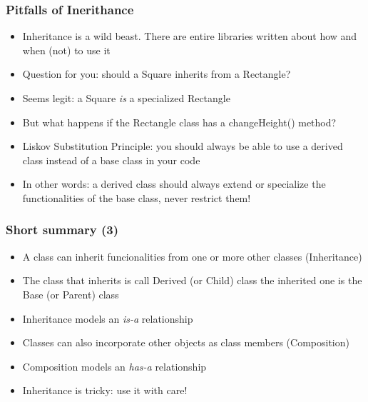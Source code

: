 \documentclass[9pt]{beamer}
\begin{document}
\begin{frame}
  \frametitle{Pitfalls of Inerithance}
    
  \begin{itemize}
    \item Inheritance is a wild beast. There are entire libraries written about how and when (not) to use it
    
    \bigskip
    
    \item Question for you: should a Square inherits from a Rectangle?
    \item Seems legit: a Square \emph{is} a specialized Rectangle
    \item But what happens if the Rectangle class has a changeHeight() method?
    \bigskip
    
    \bigskip
    
    \item \alert{Liskov Substitution Principle}: you should always be able to use
          a derived class instead of a base class in your code
    \item In other words: a derived class should always extend or specialize
          the functionalities of the base class, never restrict them!
   \end{itemize}
  
\end{frame}



\begin{frame}
  \frametitle{Short summary (3)}
    
  \begin{itemize}
    \item A class can inherit funcionalities from one or more other classes (Inheritance)
    \medskip
    \item The class that inherits is call Derived (or Child) class the inherited one is the Base (or Parent) class
    \medskip
    \item Inheritance models an \emph{is-a} relationship
    \medskip
    \item Classes can also incorporate other objects as class members (Composition)
    \medskip
    \item Composition models an \emph{has-a} relationship
    \medskip
    \item Inheritance is tricky: use it with care!
   \end{itemize}
  
\end{frame}
\end{document}
